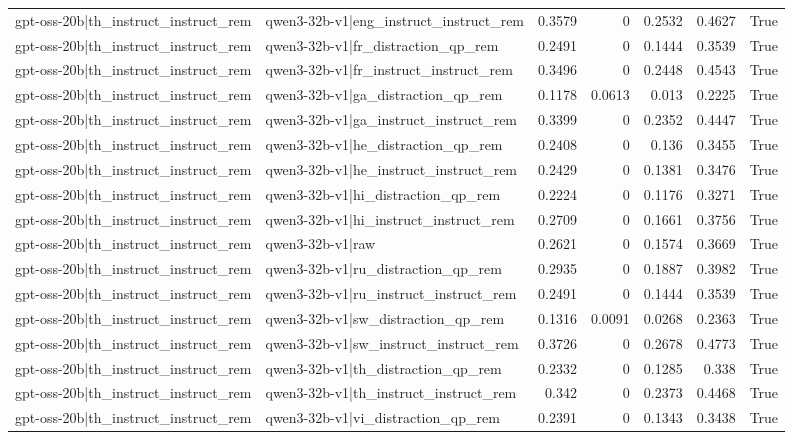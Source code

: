 \begin{table}
\begin{tabular}{l l r r r r l}
gpt-oss-20b|th_instruct_instruct_rem & qwen3-32b-v1|eng_instruct_instruct_rem & 0.3579 & 0 & 0.2532 & 0.4627 & True \\
gpt-oss-20b|th_instruct_instruct_rem & qwen3-32b-v1|fr_distraction_qp_rem & 0.2491 & 0 & 0.1444 & 0.3539 & True \\
gpt-oss-20b|th_instruct_instruct_rem & qwen3-32b-v1|fr_instruct_instruct_rem & 0.3496 & 0 & 0.2448 & 0.4543 & True \\
gpt-oss-20b|th_instruct_instruct_rem & qwen3-32b-v1|ga_distraction_qp_rem & 0.1178 & 0.0613 & 0.013 & 0.2225 & True \\
gpt-oss-20b|th_instruct_instruct_rem & qwen3-32b-v1|ga_instruct_instruct_rem & 0.3399 & 0 & 0.2352 & 0.4447 & True \\
gpt-oss-20b|th_instruct_instruct_rem & qwen3-32b-v1|he_distraction_qp_rem & 0.2408 & 0 & 0.136 & 0.3455 & True \\
gpt-oss-20b|th_instruct_instruct_rem & qwen3-32b-v1|he_instruct_instruct_rem & 0.2429 & 0 & 0.1381 & 0.3476 & True \\
gpt-oss-20b|th_instruct_instruct_rem & qwen3-32b-v1|hi_distraction_qp_rem & 0.2224 & 0 & 0.1176 & 0.3271 & True \\
gpt-oss-20b|th_instruct_instruct_rem & qwen3-32b-v1|hi_instruct_instruct_rem & 0.2709 & 0 & 0.1661 & 0.3756 & True \\
gpt-oss-20b|th_instruct_instruct_rem & qwen3-32b-v1|raw & 0.2621 & 0 & 0.1574 & 0.3669 & True \\
gpt-oss-20b|th_instruct_instruct_rem & qwen3-32b-v1|ru_distraction_qp_rem & 0.2935 & 0 & 0.1887 & 0.3982 & True \\
gpt-oss-20b|th_instruct_instruct_rem & qwen3-32b-v1|ru_instruct_instruct_rem & 0.2491 & 0 & 0.1444 & 0.3539 & True \\
gpt-oss-20b|th_instruct_instruct_rem & qwen3-32b-v1|sw_distraction_qp_rem & 0.1316 & 0.0091 & 0.0268 & 0.2363 & True \\
gpt-oss-20b|th_instruct_instruct_rem & qwen3-32b-v1|sw_instruct_instruct_rem & 0.3726 & 0 & 0.2678 & 0.4773 & True \\
gpt-oss-20b|th_instruct_instruct_rem & qwen3-32b-v1|th_distraction_qp_rem & 0.2332 & 0 & 0.1285 & 0.338 & True \\
gpt-oss-20b|th_instruct_instruct_rem & qwen3-32b-v1|th_instruct_instruct_rem & 0.342 & 0 & 0.2373 & 0.4468 & True \\
gpt-oss-20b|th_instruct_instruct_rem & qwen3-32b-v1|vi_distraction_qp_rem & 0.2391 & 0 & 0.1343 & 0.3438 & True \\

\end{tabular}
\end{table}
